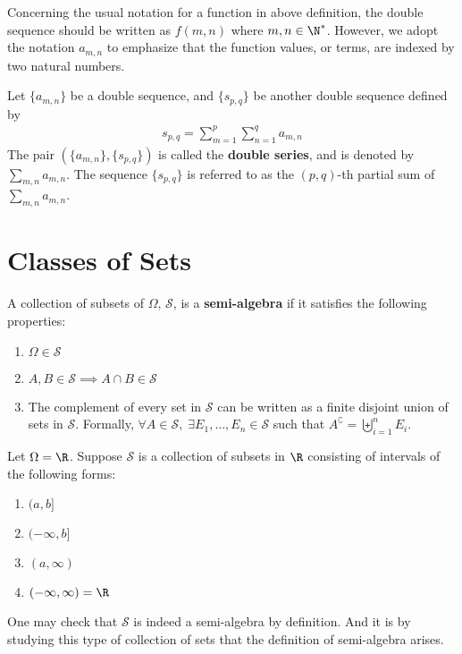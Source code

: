 \documentclass[thmcnt=section, 12pt, color=purple]{my-elegantbook}
\begin{document}
\begin{note}
	Concerning the usual notation for a function in above definition,
	the double sequence should be written as $f(m, n)$
	where $m, n \in \N^\ast$.
	However, we adopt the notation $a_{m,n}$
	to emphasize that the function values, or terms,  
	are indexed by two natural numbers.
\end{note}


\begin{definition} \label{def:11}
	Let $\{a_{m,n}\}$ be a double sequence,
	and $\{s_{p,q}\}$ be another double sequence defined by 
	\begin{align*}
		s_{p,q} = \sum_{m=1}^p \sum_{n=1}^q a_{m,n}
	\end{align*}
	The pair $(\{a_{m,n}\}, \{s_{p,q}\})$
	is called the \textbf{double series}, 
	and is denoted by $\sum_{m,n} a_{m,n}$.
	The sequence $\{s_{p,q}\}$ is referred to as
	the $(p,q)$-th partial sum of $\sum_{m,n} a_{m,n}$.
\end{definition}






\section{Classes of Sets}


\begin{definition} \label{def:1}
	A collection of subsets of $\Omega$, $\mathcal{S}$, 
	is a \textbf{semi-algebra}
	if it satisfies the following properties:
	\begin{enumerate}
		\item $\Omega \in \mathcal{S}$
		\item $A, B \in \mathcal{S} \implies A \cap B \in \mathcal{S}$
		\item The complement of every set in $\mathcal{S}$ can be 
			written as a finite disjoint union 
			of sets in $\mathcal{S}$. 
			Formally, $\forall A \in \mathcal{S}, \; \exists E_1, \ldots, E_n \in \mathcal{S}$
			such that $A^\complement = \biguplus_{i=1}^n E_i$.
	\end{enumerate}
\end{definition}

\begin{example} \label{eg:1}
	Let $\Omega = \R$.
	Suppose $\mathcal{S}$ is a collection of subsets in $\R$
	consisting of intervals of the following forms:
	\begin{enumerate}
		\item $(a, b]$
		\item $(-\infty, b]$
		\item $(a, \infty)$
		\item $(-\infty, \infty) = \R$
	\end{enumerate}
	One may check that $\mathcal{S}$ is indeed a semi-algebra by definition.
	And it is by studying this type of collection of sets that
	the definition of semi-algebra arises.
\end{example}
\end{document}

